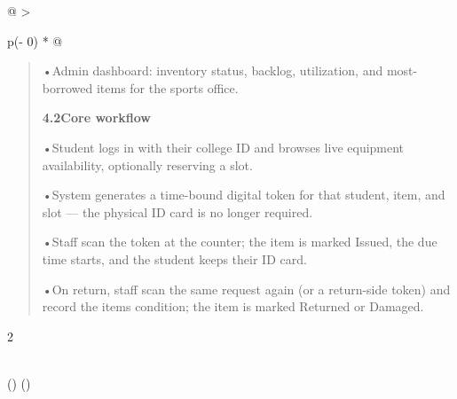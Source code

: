 \documentclass[
]{article}
\begin{document}
\begin{longtable}[]{@{}
  >{\raggedright\arraybackslash}p{(\columnwidth - 0\tabcolsep) * }@{}}
\begin{minipage}[b]{\linewidth}
\begin{quote}
•Admin dashboard: inventory status, backlog, utilization, and
most-borrowed items for the sports office.

\textbf{4.2Core workflow}

•Student logs in with their college ID and browses live equipment
availability, optionally reserving a slot.

•System generates a time-bound digital token for that student, item, and
slot --- the physical ID card is no longer required.

•Staff scan the token at the counter; the item is marked Issued, the due
time starts, and the student keeps their ID card.

•On return, staff scan the same request again (or a return-side token)
and record the item\textquotesingle s condition; the item is marked
Returned or Damaged.
\end{quote}

2
\end{minipage} \\
\midrule()
\endhead
\bottomrule()
\end{longtable}
\end{document}
